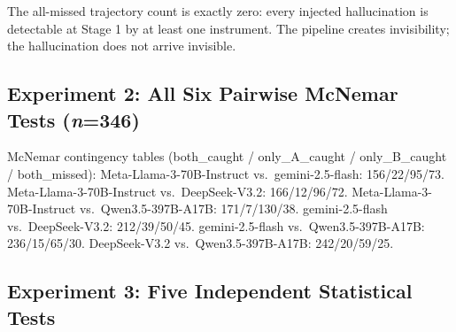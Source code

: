 \documentclass{article}
\theoremstyle{plain}
\theoremstyle{definition}
\theoremstyle{remark}
\begin{document}
The all-missed trajectory count is exactly zero: every injected hallucination is detectable at Stage 1 by at least one instrument. The pipeline creates invisibility; the hallucination does not arrive invisible.

\subsection{Experiment 2: All Six Pairwise McNemar Tests (\textit{n}=346)}

\begin{table}[h]
\centering
\label{tab:mcnemar}
\vspace{5pt}
\caption{All six pairwise McNemar tests.}
\end{table}

McNemar contingency tables (both\_caught / only\_A\_caught / 
only\_B\_caught / both\_missed): Meta-Llama-3-70B-Instruct vs.\ gemini-2.5-flash: 156/22/95/73. 
Meta-Llama-3-70B-Instruct vs.\ DeepSeek-V3.2: 166/12/96/72. Meta-Llama-3-70B-Instruct vs.\ Qwen3.5-397B-A17B: 171/7/130/38. 
gemini-2.5-flash vs.\ DeepSeek-V3.2: 212/39/50/45. gemini-2.5-flash vs.\ Qwen3.5-397B-A17B: 236/15/65/30. 
DeepSeek-V3.2 vs.\ Qwen3.5-397B-A17B: 242/20/59/25.

\subsection{Experiment 3: Five Independent Statistical Tests}
\end{document}

